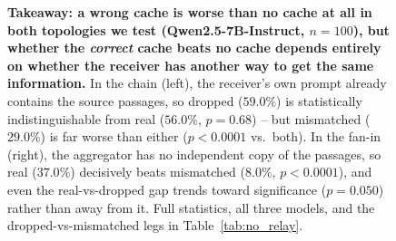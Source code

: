 \begin{figure}[t]
\caption{\textbf{Takeaway: a wrong cache is worse than no cache at all
in both topologies we test (Qwen2.5-7B-Instruct, $n{=}100$), but
whether the \emph{correct} cache beats no cache depends entirely on
whether the receiver has another way to get the same information.} In
the chain (left), the receiver's own prompt already contains the source
passages, so dropped ($59.0\%$) is statistically indistinguishable from
real ($56.0\%$, $p=0.68$) -- but mismatched ($29.0\%$) is far worse than
either ($p<0.0001$ vs.\ both). In the fan-in (right), the aggregator has
no independent copy of the passages, so real ($37.0\%$) decisively
beats mismatched ($8.0\%$, $p<0.0001$), and even the real-vs-dropped gap
trends toward significance ($p=0.050$) rather than away from it. Full
statistics, all three models, and the dropped-vs-mismatched legs in
Table~\ref{tab:no_relay}.}
\label{fig:headline}
\end{figure}
